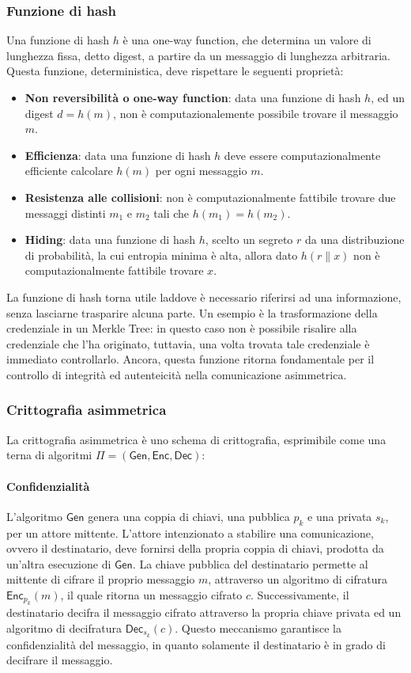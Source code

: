 \documentclass[a4paper,12pt]{article}
\begin{document}
\subsubsection{Funzione di hash}
Una funzione di hash $h$ è una one-way function, che determina un valore di lunghezza fissa, detto digest, a partire da un messaggio di lunghezza arbitraria. Questa funzione, deterministica, deve rispettare le seguenti proprietà:
\begin{itemize}
    \item \textbf{Non reversibilità o one-way function}: data una funzione di hash $h$, ed un digest $d=h(m)$, non è computazionalemente possibile trovare il messaggio $m$.
    \item \textbf{Efficienza}: data una funzione di hash $h$ deve essere computazionalmente efficiente calcolare $h(m)$ per ogni messaggio $m$.
    \item \textbf{Resistenza alle collisioni}: non è computazionalmente fattibile trovare due messaggi distinti $m_1$ e $m_2$ tali che $h(m_1)=h(m_2)$.
    \item \textbf{Hiding}: data una funzione di hash $h$, scelto un segreto $r$ da una distribuzione di probabilità, la cui entropia minima è alta, allora dato $h(r\|x)$ non è computazionalmente fattibile trovare $x$.
\end{itemize}
La funzione di hash torna utile laddove è necessario riferirsi ad una informazione, senza lasciarne trasparire alcuna parte. Un esempio è la trasformazione della credenziale in un Merkle Tree: in questo caso non è possibile risalire alla credenziale che l'ha originato, tuttavia, una volta trovata tale credenziale è immediato controllarlo.
\newline Ancora, questa funzione ritorna fondamentale per il controllo di integrità ed autenteicità nella comunicazione asimmetrica.

\subsubsection{Crittografia asimmetrica}
La crittografia asimmetrica è uno schema di crittografia, esprimibile come una terna di algoritmi $\Pi=\mathsf{(Gen, Enc, Dec)}$:
\paragraph{Confidenzialità} 
L'algoritmo $\mathsf{Gen}$ genera una coppia di chiavi, una pubblica $p_k$ e una privata $s_k$, per un attore mittente. L'attore intenzionato a stabilire una comunicazione, ovvero il destinatario, deve fornirsi della propria coppia di chiavi, prodotta da un'altra esecuzione di $\mathsf{Gen}$. 
La chiave pubblica del destinatario permette al mittente di cifrare il proprio messaggio $m$, attraverso un algoritmo di cifratura $\mathsf{Enc}_{p_k}(m)$, il quale ritorna un messaggio cifrato $c$. Successivamente, il destinatario decifra il messaggio cifrato attraverso la propria chiave privata ed un algoritmo di decifratura $\mathsf{Dec}_{s_k}(c)$.
Questo meccanismo garantisce la confidenzialità del messaggio, in quanto solamente il destinatario è in grado di decifrare il messaggio.
\end{document}
